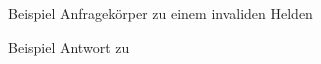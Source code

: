 \begin{listing}[!h]
    \caption{Beispiel Anfragekörper zu einem invaliden Helden}\label{lst:invalidheroexamplejson}
\end{listing}

\begin{listing}[!h]
    \caption{Beispiel Antwort zu \protect{}}\label{lst:invalidheroresponseexamplejson}
\end{listing}